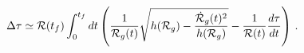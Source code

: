 \begin{equation}\label{delay} 
\Delta\tau \simeq {\cal R}(t_f) \int_0 ^{t_f} dt \left({{1}\over
{{\cal R}_g(t)}} 
\sqrt{h({\cal R}_g)- {{\dot {\cal R}_g(t)^2}\over {h({\cal R}_g)}}} -
{1 \over {{\cal R}(t)}} 
{{d\tau}\over{dt}} \right) \, .
\end{equation}

